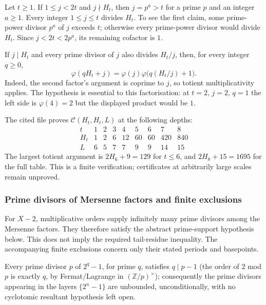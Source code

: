 \begin{thm}\label{thm:nondivisors-short-lcm-window}
Let $t\ge1$. If $1\le j<2t$ and $j\nmid H_t$, then
$j=p^a>t$ for a prime $p$ and an integer $a\ge1$. Every integer
$1\le j\le t$ divides $H_t$.
To see the first claim, some prime-power divisor $p^a$ of $j$ exceeds $t$;
otherwise every prime-power divisor would divide $H_t$. Since
$j<2t<2p^a$, its remaining cofactor is $1$.

If $j\mid H_t$ and every prime divisor of $j$ also divides $H_t/j$, then,
for every integer $q\ge0$,
\[
 \varphi(qH_t+j)=\varphi(j)\varphi\bigl(q(H_t/j)+1\bigr).
\]
Indeed, the second factor's argument is coprime to $j$, so totient
multiplicativity applies. The hypothesis is essential to this
factorisation: at $t=2$, $j=2$, $q=1$ the left side is $\varphi(4)=2$
but the displayed product would be $1$.
\end{thm}

\begin{obs}
The cited file proves $\mathcal C(H_t,H_t,L)$ at the following depths:
\[
 \begin{array}{c|rrrrrrrr}
 t&1&2&3&4&5&6&7&8\\
 H_t&1&2&6&12&60&60&420&840\\
 L&6&5&7&7&9&9&14&15
 \end{array}
\]
The largest totient argument is $2H_6+9=129$ for $t\le6$, and
$2H_8+15=1695$ for the full table.
\quad {}
This is a finite verification; certificates at arbitrarily large scales
remain unproved.
\end{obs}

\subsubsection{Prime divisors of Mersenne factors and finite exclusions}

For $X-2$, multiplicative orders supply infinitely many prime divisors
among the Mersenne factors. They therefore satisfy the abstract
prime-support hypothesis below. This does not imply the required
tail-residue inequality. The accompanying finite exclusions concern
only their stated periods and basepoints.


\begin{thm}\label{thm:unbounded-prime-support-mersenne-factors}
Every prime divisor $p$ of $2^q-1$, for prime $q$, satisfies $q\mid p-1$
(the order of $2$ mod $p$ is exactly $q$, by Fermat/Lagrange in
$(\mathbb{Z}/p)^\times$); consequently the prime divisors appearing in the
layers $\{2^n-1\}$ are unbounded, unconditionally, with no cyclotomic
resultant hypothesis left open.
\end{thm}

